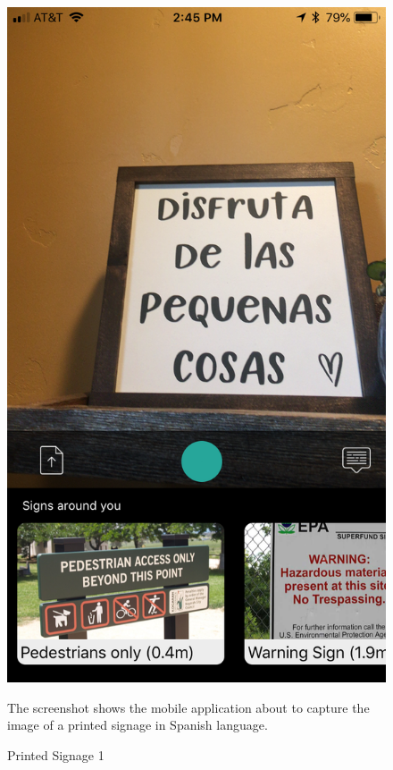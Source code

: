 \documentclass[12pt]{article}
\begin{document}
 \begin{figure} [H]
\centering
\begin{minipage}{.5\textwidth}
  \centering
  \includegraphics[width=0.9\linewidth]{media/1.png}
  \caption{Printed Signage 1}{The screenshot shows the mobile application about to capture the image of a printed signage in Spanish language.}
  \label{fig:case3ins}
\end{minipage}%
\begin{minipage}{.5\textwidth}
  \centering

\end{minipage}
\end{figure}
\end{document}
